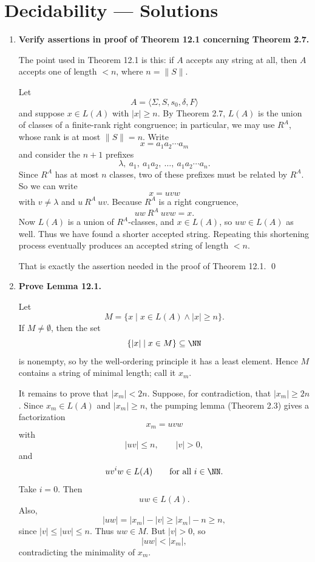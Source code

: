 
\chapter{Decidability --- Solutions}

\begin{enumerate}[{12.}1. ]

\item \textbf{Verify assertions in proof of Theorem 12.1 concerning Theorem 2.7.}

The point used in Theorem 12.1 is this: if $A$ accepts any string at all, then
$A$ accepts one of length $< n$, where $n=\|S\|$.

Let
\[
A=\langle \Sigma,S,s_0,\delta,F\rangle
\]
and suppose $x\in L(A)$ with $|x|\geq n$. By Theorem 2.7, $L(A)$ is the union
of classes of a finite-rank right congruence; in particular, we may use
$R^A$, whose rank is at most $\|S\|=n$. Write
\[
x=a_1a_2\cdots a_m
\]
and consider the $n+1$ prefixes
\[
\lambda,\ a_1,\ a_1a_2,\ \ldots,\ a_1a_2\cdots a_n.
\]
Since $R^A$ has at most $n$ classes, two of these prefixes must be related by
$R^A$. So we can write
\[
x=uvw
\]
with $v\neq\lambda$ and $u\ R^A\ uv$. Because $R^A$ is a right congruence,
\[
uw\ R^A\ uvw=x.
\]
Now $L(A)$ is a union of $R^A$-classes, and $x\in L(A)$, so $uw\in L(A)$ as
well. Thus we have found a shorter accepted string. Repeating this shortening
process eventually produces an accepted string of length $<n$.

That is exactly the assertion needed in the proof of Theorem 12.1. \qed

\item \textbf{Prove Lemma 12.1.}

Let
\[
M=\{x\mid x\in L(A)\wedge |x|\geq n\}.
\]
If $M\neq\emptyset$, then the set
\[
\{|x|\mid x\in M\}\subseteq \NN
\]
is nonempty, so by the well-ordering principle it has a least element. Hence
$M$ contains a string of minimal length; call it $x_m$.

It remains to prove that $|x_m|<2n$. Suppose, for contradiction, that
$|x_m|\geq 2n$. Since $x_m\in L(A)$ and $|x_m|\geq n$, the pumping lemma
(Theorem 2.3) gives a factorization
\[
x_m=uvw
\]
with
\[
|uv|\leq n,\qquad |v|>0,
\]
and
\[
uv^iw\in L(A)\qquad\text{for all }i\in\NN.
\]
Take $i=0$. Then
\[
uw\in L(A).
\]
Also,
\[
|uw|=|x_m|-|v|\geq |x_m|-n\geq n,
\]
since $|v|\leq |uv|\leq n$. Thus $uw\in M$. But $|v|>0$, so
\[
|uw|<|x_m|,
\]
contradicting the minimality of $x_m$.


\end{enumerate}
